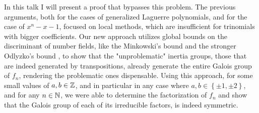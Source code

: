 \documentclass[../main.tex]{subfiles}
\begin{document}
In this talk I will present a proof that bypasses this problem.
The previous arguments, both for the cases of generalized Laguerre polynomials, and for the case of $x^n - x - 1$, focused on local methods, which are insufficient for trinomials with bigger coefficients. 
Our new approach utilizes global bounds on the discriminant of number fields, like the Minkowski's bound and the stronger Odlyzko's bound \cite{OdlyzkoBoundsII}, to show that the "unproblematic" inertia groups, those that are indeed generated by transpositions, already generate the entire Galois group of $f_n$, rendering the problematic ones dispensable.
Using this approach, for some small values of $a,b \in \mathbb{Z}$, and in particular in any case where $a,b \in \left\{ \pm 1, \pm 2 \right\}$, and for any $n \in \mathbb{N}$, we were able to determine the factorization of $f_n$ and show that the Galois group of each of its irreducible factors, is indeed symmetric.
\end{document}
